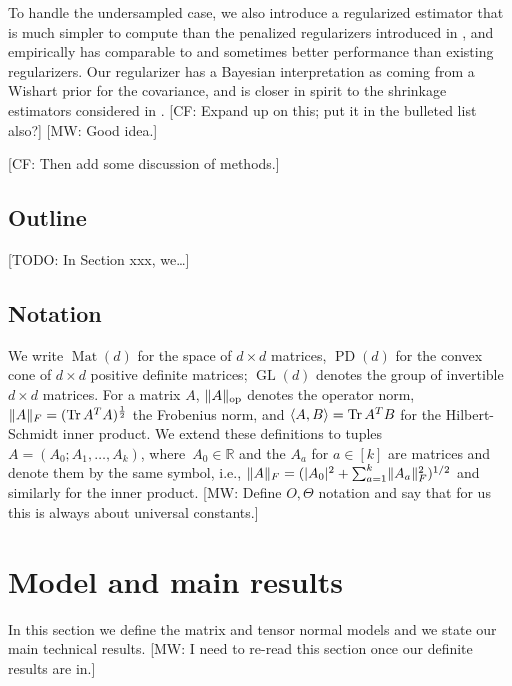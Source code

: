 \documentclass[aos]{imsart}
\theoremstyle{definition}
\numberwithin{equation}{section}
\DeclareMathOperator{\op}{op}
\DeclareMathOperator{\Mat}{Mat}
\DeclareMathOperator{\GL}{GL}
\DeclareMathOperator{\tr}{Tr}
\DeclareMathOperator{\PD}{PD}
\DeclarePairedDelimiter{\abs}{\lvert}{\rvert}
\DeclarePairedDelimiter{\norm}{\lVert}{\rVert}
\newcommand{\R}{{\mathbb{R}}}
\newcommand{\CF}[1]{{\color{purple}[CF: #1]}}
\newcommand{\MW}[1]{{\color{red}[MW: #1]}}
\newcommand{\TODO}[1]{{\color{blue}[TODO: #1]}}
\begin{document}
To handle the undersampled case, we also introduce a regularized estimator that is much simpler to compute than the penalized regularizers introduced in \cite{tsiligkaridis2013convergence,sun2015nonconvex,zhou2014gemini}, and empirically has comparable to and sometimes better performance than existing regularizers.
Our regularizer has a Bayesian interpretation as coming from a Wishart prior for the covariance, and is closer in spirit to the shrinkage estimators considered in \cite{goes2020robust}.
\CF{Expand up on this; put it in the bulleted list also?}
\MW{Good idea.}

\CF{Then add some discussion of methods.}

\subsection{Outline}
\TODO{In Section xxx, we\dots}

\subsection{Notation}
We write $\Mat(d)$ for the space of $d\times d$ matrices, $\PD(d)$ for the convex cone of $d\times d$ positive definite matrices; $\GL(d)$ denotes the group of invertible $d\times d$ matrices.
For a matrix $A$, $\norm{A}_{\op}$ denotes the operator norm, $\norm{A}_F = (\tr A^T A)^{\frac12}$ the Frobenius norm, and $\braket{A,B} = \tr A^T B$ for the Hilbert-Schmidt inner product.
We extend these definitions to tuples $A=(A_0;A_1,\dots,A_k)$, where~$A_0\in\R$ and the $A_a$ for $a\in[k]$ are matrices and denote them by the same symbol, i.e., $\norm{A}_F = (\abs{A_0}^2 + \sum_{a=1}^k \norm{A_a}_F^2)^{1/2}$ and similarly for the inner product.
\MW{Define $O, \Theta$ notation and say that for us this is always about universal constants.}

\section{Model and main results}\label{sec:main results}
In this section we define the matrix and tensor normal models and we state our main technical results.
\MW{I need to re-read this section once our definite results are in.}
\end{document}
